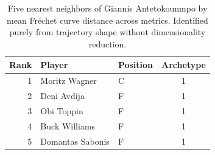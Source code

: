 \begin{table}[htbp]
  \centering\small
  \begin{tabular}{rllc}
    \toprule
    Rank & Player & Position & Archetype \\
    \midrule
    1 & Moritz Wagner & C & 1 \\
    2 & Deni Avdija & F & 1 \\
    3 & Obi Toppin & F & 1 \\
    4 & Buck Williams & F & 1 \\
    5 & Domantas Sabonis & F & 1 \\
    \bottomrule
  \end{tabular}
  \caption{Five nearest neighbors of Giannis Antetokounmpo by mean Fr\'{e}chet curve distance across metrics. Identified purely from trajectory shape without dimensionality reduction.}
  \label{tab:Giannis_Antetokounmpo_frechet_curve_neighbors}
\end{table}

